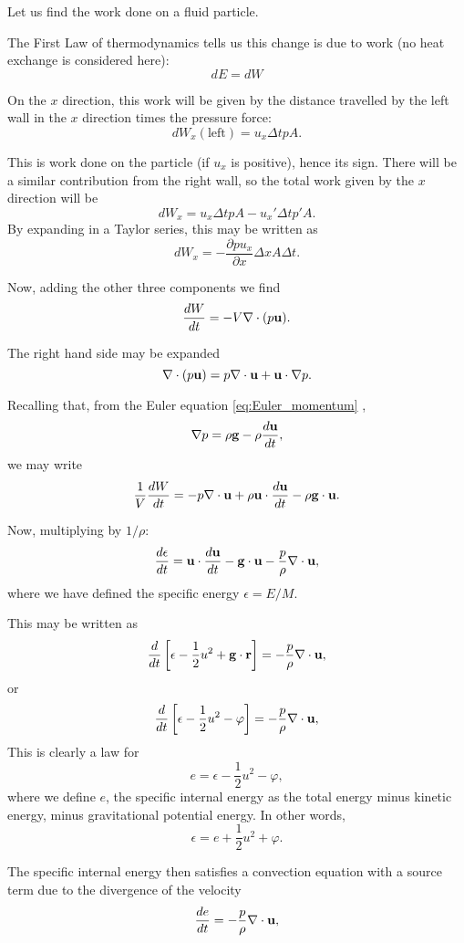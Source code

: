 Let us find the work done on a fluid particle.

The First Law of thermodynamics tells us this change is due
to work (no heat exchange is considered here):
\[
dE=dW
\]

On the $x$ direction, this work will be given by the distance
travelled by the left wall in the $x$ direction times the pressure
force:
\[
dW_x (\mathrm{left})  = u_x \Delta t p A .
\]

This is work done on the particle (if $u_x$ is positive), hence its
sign. There will be a similar contribution from the right wall, so the
total work given by the $x$ direction will be
\[
dW_x = u_x \Delta t p A  -  u_x'  \Delta t p' A .
\]
By expanding in a Taylor series, this may be written as
\[
dW_x = - \frac{\partial p u_x}{\partial x} \Delta x A \Delta t.
\]

Now, adding the other three components we find
\[
\frac{dW}{dt} = - V \nabla\cdot (p\mathbf{u}) .
\]

The right hand side may be expanded
\[
\nabla\cdot (p\mathbf{u}) =
 p \nabla\cdot \mathbf{u} + 
 \mathbf{u} \cdot \nabla p .
\]

Recalling that, from the Euler equation \ref{eq:Euler_momentum} ,
\[
\nabla p  = \rho \mathbf{g} - \rho \frac{d \mathbf{u}}{dt} ,
\]
we may write
\[
\frac{1}{V} \frac{dW}{dt} =
-  p \nabla\cdot \mathbf{u} +
\rho  \mathbf{u} \cdot \frac{d \mathbf{u}}{dt}  -
\rho  \mathbf{g} \cdot  \mathbf{u} .
\]

Now, multiplying by $1/\rho$:
\begin{equation}
  \label{eq:specific_energy}
  \frac{d \epsilon }{dt} =
  \mathbf{u} \cdot \frac{d \mathbf{u}}{dt}  -
  \mathbf{g} \cdot  \mathbf{u} 
  -  \frac{p}{\rho} \nabla\cdot \mathbf{u} ,
\end{equation}
where we have defined the specific energy $\epsilon=E/M$.

This may be written as
\[
\frac{d}{dt} \left[
  \epsilon - \frac12 u^2  + \mathbf{g} \cdot \mathbf{r}
  \right] = -  \frac{p}{\rho} \nabla\cdot \mathbf{u} ,
\]
or
\[
\frac{d}{dt} \left[
  \epsilon - \frac12 u^2  - \varphi
  \right] = -  \frac{p}{\rho} \nabla\cdot \mathbf{u} ,
\]
%
This is clearly a law for
\[
e = \epsilon - \frac12 u^2  - \varphi ,
\]
where we define $e$, the specific internal energy as the total energy
minus kinetic energy, minus gravitational potential energy. In other words,
\[
\epsilon  = e  + \frac12 u^2  + \varphi .
\]

The specific internal energy then satisfies a convection equation with
a source term due to the divergence of the velocity
\begin{equation}
  \label{eq:Euler_energy}
  \frac{d e}{dt}  = -  \frac{p}{\rho} \nabla\cdot \mathbf{u} ,  
\end{equation}

